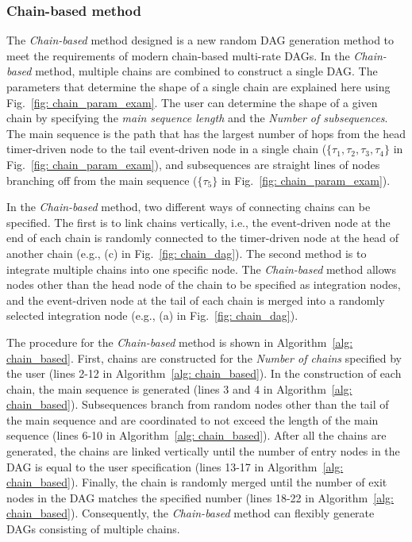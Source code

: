 \subsubsection{Chain-based method}
\label{sssec: chain_based_method}

The {\it Chain-based} method designed is a new random DAG generation method to meet the requirements of modern chain-based multi-rate DAGs.
In the {\it Chain-based} method, multiple chains are combined to construct a single DAG.
The parameters that determine the shape of a single chain are explained here using Fig.~\ref{fig: chain_param_exam}.
The user can determine the shape of a given chain by specifying the {\it main sequence length} and the {\it Number of subsequences}.
The main sequence is the path that has the largest number of hops from the head timer-driven node to the tail event-driven node in a single chain ($\{\tau_1, \tau_2, \tau_3, \tau_4\}$ in Fig.~\ref{fig: chain_param_exam}), and subsequences are straight lines of nodes branching off from the main sequence ($\{\tau_5\}$ in Fig.~\ref{fig: chain_param_exam}).

In the {\it Chain-based} method, two different ways of connecting chains can be specified.
The first is to link chains vertically, i.e., the event-driven node at the end of each chain is randomly connected to the timer-driven node at the head of another chain (e.g., (c) in Fig.~\ref{fig: chain_dag}).
The second method is to integrate multiple chains into one specific node.
The {\it Chain-based} method allows nodes other than the head node of the chain to be specified as integration nodes, and the event-driven node at the tail of each chain is merged into a randomly selected integration node (e.g., (a) in Fig.~\ref{fig: chain_dag}).

The procedure for the {\it Chain-based} method is shown in Algorithm~\ref{alg: chain_based}.
First, chains are constructed for the {\it Number of chains} specified by the user (lines 2-12 in Algorithm~\ref{alg: chain_based}).
In the construction of each chain, the main sequence is generated (lines 3 and 4 in Algorithm~\ref{alg: chain_based}).
Subsequences branch from random nodes other than the tail of the main sequence and are coordinated to not exceed the length of the main sequence (lines 6-10 in Algorithm~\ref{alg: chain_based}).
After all the chains are generated, the chains are linked vertically until the number of entry nodes in the DAG is equal to the user specification (lines 13-17 in Algorithm~\ref{alg: chain_based}).
Finally, the chain is randomly merged until the number of exit nodes in the DAG matches the specified number (lines 18-22 in Algorithm~\ref{alg: chain_based}).
Consequently, the {\it Chain-based} method can flexibly generate DAGs consisting of multiple chains.


